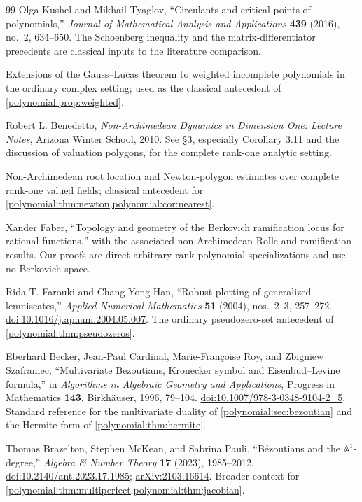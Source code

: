 \documentclass[11pt,letterpaper]{article}
\numberwithin{equation}{section}
\theoremstyle{definition}
\theoremstyle{remark}\newtheorem{remark}[theorem]{Remark}
\begin{document}
\begin{thebibliography}{99}
Olga Kushel and Mikhail Tyaglov, ``Circulants and critical points of
polynomials,'' \emph{Journal of Mathematical Analysis and Applications}
\textbf{439} (2016), no.~2, 634--650. The Schoenberg inequality and the
matrix-differentiator precedents are classical inputs to the literature
comparison.

Extensions of the Gauss--Lucas theorem to weighted incomplete polynomials in
the ordinary complex setting; used as the classical antecedent of
\cref{polynomial:prop:weighted}.

Robert L. Benedetto, \emph{Non-Archimedean Dynamics in Dimension One: Lecture
Notes}, Arizona Winter School, 2010. See \S3, especially Corollary 3.11 and
the discussion of valuation polygons, for the complete rank-one analytic
setting.

Non-Archimedean root location and Newton-polygon estimates over complete
rank-one valued fields; classical antecedent for
\cref{polynomial:thm:newton,polynomial:cor:nearest}.

Xander Faber, ``Topology and geometry of the Berkovich ramification locus for
rational functions,'' with the associated non-Archimedean Rolle and
ramification results. Our proofs are direct arbitrary-rank polynomial
specializations and use no Berkovich space.

Rida T. Farouki and Chang Yong Han,
``Robust plotting of generalized lemniscates,''
\emph{Applied Numerical Mathematics} \textbf{51} (2004), nos.~2--3, 257--272.
\href{https://doi.org/10.1016/j.apnum.2004.05.007}{doi:10.1016/j.apnum.2004.05.007}.
The ordinary pseudozero-set antecedent of \cref{polynomial:thm:pseudozeros}.

Eberhard Becker, Jean-Paul Cardinal, Marie-Fran\c{c}oise Roy,
and Zbigniew Szafraniec,
``Multivariate Bezoutians, Kronecker symbol and Eisenbud--Levine formula,''
in \emph{Algorithms in Algebraic Geometry and Applications},
Progress in Mathematics \textbf{143}, Birkh\"auser, 1996, 79--104.
\href{https://doi.org/10.1007/978-3-0348-9104-2_5}{doi:10.1007/978-3-0348-9104-2\_5}.
Standard reference for the multivariate duality of
\cref{polynomial:sec:bezoutian} and the Hermite form of
\cref{polynomial:thm:hermite}.

Thomas Brazelton, Stephen McKean, and Sabrina Pauli,
``B\'ezoutians and the $\mathbb A^1$-degree,''
\emph{Algebra \& Number Theory} \textbf{17} (2023), 1985--2012.
\href{https://doi.org/10.2140/ant.2023.17.1985}{doi:10.2140/ant.2023.17.1985};
\href{https://arxiv.org/abs/2103.16614}{arXiv:2103.16614}.
Broader context for
\cref{polynomial:thm:multiperfect,polynomial:thm:jacobian}.


\end{thebibliography}
\end{document}
